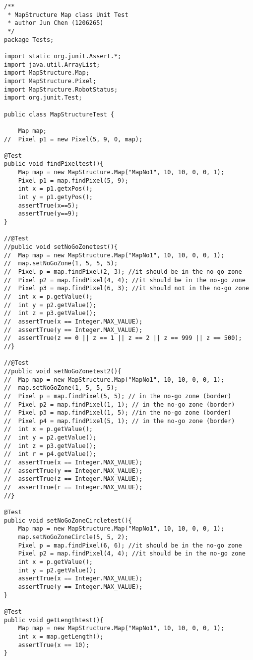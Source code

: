\documentclass[12pt, a4paper]{report}
\begin{document}
\begin{lstlisting} 
/**
 * MapStructure Map class Unit Test
 * author Jun Chen (1206265)
 */
package Tests;

import static org.junit.Assert.*;
import java.util.ArrayList;
import MapStructure.Map;
import MapStructure.Pixel;
import MapStructure.RobotStatus;
import org.junit.Test;
 
public class MapStructureTest {
	
	Map map;
//	Pixel p1 = new Pixel(5, 9, 0, map);
	
@Test	
public void findPixeltest(){
	Map map	= new MapStructure.Map("MapNo1", 10, 10, 0, 0, 1);
	Pixel p1 = map.findPixel(5, 9);
	int x = p1.getxPos();
	int y = p1.getyPos();
	assertTrue(x==5);
	assertTrue(y==9);
}

//@Test
//public void setNoGoZonetest(){
//	Map map	= new MapStructure.Map("MapNo1", 10, 10, 0, 0, 1);
//	map.setNoGoZone(1, 5, 5, 5);
//	Pixel p = map.findPixel(2, 3); //it should be in the no-go zone
//	Pixel p2 = map.findPixel(4, 4); //it should be in the no-go zone
//	Pixel p3 = map.findPixel(6, 3); //it should not in the no-go zone
//	int x = p.getValue();
//	int y = p2.getValue();
//	int z = p3.getValue();
//	assertTrue(x == Integer.MAX_VALUE);
//	assertTrue(y == Integer.MAX_VALUE);
//	assertTrue(z == 0 || z == 1 || z == 2 || z == 999 || z == 500);
//}

//@Test
//public void setNoGoZonetest2(){
//	Map map	= new MapStructure.Map("MapNo1", 10, 10, 0, 0, 1);
//	map.setNoGoZone(1, 5, 5, 5);
//	Pixel p = map.findPixel(5, 5); // in the no-go zone (border)
//	Pixel p2 = map.findPixel(1, 1); // in the no-go zone (border)
//	Pixel p3 = map.findPixel(1, 5); //in the no-go zone (border)
//	Pixel p4 = map.findPixel(5, 1); // in the no-go zone (border)
//	int x = p.getValue();
//	int y = p2.getValue();
//	int z = p3.getValue();
//	int r = p4.getValue();
//	assertTrue(x == Integer.MAX_VALUE);
//	assertTrue(y == Integer.MAX_VALUE);
//	assertTrue(z == Integer.MAX_VALUE);
//	assertTrue(r == Integer.MAX_VALUE);
//}
	
@Test
public void setNoGoZoneCircletest(){
	Map map	= new MapStructure.Map("MapNo1", 10, 10, 0, 0, 1);
	map.setNoGoZoneCircle(5, 5, 2);
	Pixel p = map.findPixel(6, 6); //it should be in the no-go zone
	Pixel p2 = map.findPixel(4, 4); //it should be in the no-go zone
	int x = p.getValue();
	int y = p2.getValue();
	assertTrue(x == Integer.MAX_VALUE);
	assertTrue(y == Integer.MAX_VALUE);
}

@Test
public void getLengthtest(){
	Map map	= new MapStructure.Map("MapNo1", 10, 10, 0, 0, 1);
	int x = map.getLength();
	assertTrue(x == 10);
}


\end{lstlisting}
\end{document}
